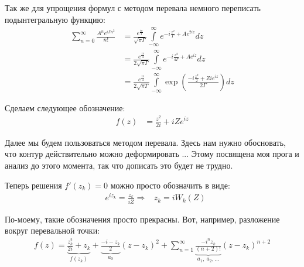 \documentclass[a4paper, 12pt]{article}
\begin{document}
Так же для упрощения формул с методом перевала немного переписать подынтегральную функцию:
\begin{equation}
\begin{aligned}
    \sum\limits_{n=0}^{\infty} \frac{A^n e^{i\Gamma n^2}}{n!} 
    &= \frac{e^{\frac{i\pi}{4}}}{\sqrt{\pi\Gamma}}
    \int\limits_{-\infty}^{\infty}e^{-i \frac{z^2}{\Gamma} + A e^{2iz}}dz \\
    &= \frac{e^{\frac{i\pi}{4}}}{2\sqrt{\pi\Gamma}}
    \int\limits_{-\infty}^{\infty}e^{-i \frac{z^2}{4\Gamma} + A e^{iz}}dz \\
    &= \frac{e^{\frac{i\pi}{4}}}{2\sqrt{\pi\Gamma}}
    \int\limits_{-\infty}^{\infty}\exp\left(\frac{-i\frac{z^2}{2} + Z i e^{iz}}{2\Gamma}\right)dz 
\end{aligned}
\end{equation}

Сделаем следующее обозначение:
\begin{equation}
\begin{aligned}
    f(z) &=  \frac{z^2}{2i} + i Z e^{iz}
\end{aligned}
\end{equation}

Далее мы будем пользоваться методом перевала. Здесь нам нужно обосновать, что контур действительно можно деформировать ... Этому посвящена моя прога и анализ до этого момента, так что дописать это будет не трудно.

Теперь решения $f'(z_k) = 0$ можно просто обозначить в виде:
\begin{equation}
\begin{aligned}
    &e^{i z_k} = \frac{z_k}{iZ} \Rightarrow
    &z_k = i W_k(Z)
\end{aligned}
\end{equation}

По-моему, такие обозначения просто прекрасны. Вот, например, разложение вокруг перевальной точки:
\begin{equation}
\begin{aligned}
    f(z) = \underbrace{\frac{z_k^2}{2i} + z_k}_{f(z_k)} + \underbrace{\frac{-i-z_k}{2}}_{a_0} (z-z_k)^2 + 
    \sum_{n=1}^{\infty} \underbrace{\frac{-i^n z_k}{(n+2)!}}_{a_1, \: a_2, \dots} (z-z_k)^{n+2}
\end{aligned}
\end{equation}
\end{document}
